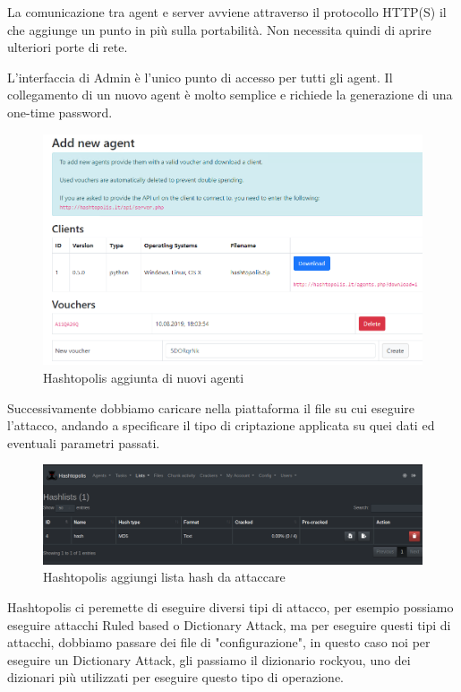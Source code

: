 La comunicazione tra agent e server avviene attraverso il protocollo HTTP(S) il che aggiunge un punto in più sulla portabilità. Non necessita quindi di aprire ulteriori porte di rete.

L’interfaccia di Admin è l’unico punto di accesso per tutti gli agent. Il collegamento di un nuovo agent è molto semplice e richiede la generazione di una one-time password. 

\begin{figure}[ht]
    \centering
    \includegraphics[width=\linewidth]{Immagini/8/hashtopolis_new_agent.png}
    \caption{Hashtopolis aggiunta di nuovi agenti}
\end{figure}

Successivamente dobbiamo caricare nella piattaforma il file su cui eseguire l'attacco, andando a specificare il tipo di criptazione applicata su quei dati ed eventuali parametri passati.

\begin{figure}[ht]
    \centering
    \includegraphics[width=\linewidth]{Immagini/8/hashtopolis_2.png}
    \caption{Hashtopolis aggiungi lista hash da attaccare}
\end{figure}

Hashtopolis ci peremette di eseguire diversi tipi di attacco, per esempio possiamo eseguire attacchi Ruled based o Dictionary Attack, ma per eseguire questi tipi di attacchi, dobbiamo passare dei file di "configurazione", in questo caso noi per eseguire un Dictionary Attack, gli passiamo il dizionario rockyou, uno dei dizionari più utilizzati per eseguire questo tipo di operazione.

